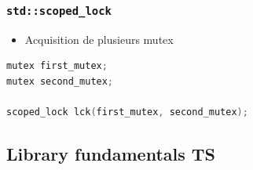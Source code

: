 \documentclass[C++.tex]{subfiles}
\begin{document}
\begin{frame}[fragile]
	\frametitle{\lstinline|std::scoped_lock|}
	\begin{itemize}
		\item Acquisition de plusieurs mutex
	\end{itemize}

	\begin{lstlisting}[language=C++]
mutex first_mutex;
mutex second_mutex;

scoped_lock lck(first_mutex, second_mutex);\end{lstlisting}
\end{frame}

\subsection*{Library fundamentals TS}
\end{document}
